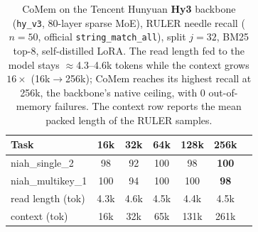 \begin{table}[t]
\centering
\small
\begin{tabular}{@{}lcccccc@{}}
\toprule
\textbf{Task} & 16k & 32k & 64k & 128k & 256k \\
\midrule
niah\_single\_2   &  98 & 92 & 100 &  98 & \textbf{100} \\
niah\_multikey\_1 & 100 & 94 & 100 & 100 & \textbf{98} \\
\midrule
read length (tok) & 4.3k & 4.6k & 4.5k & 4.4k & 4.5k \\
context (tok)     & 16k  & 32k  & 65k  & 131k & 261k \\
\bottomrule
\end{tabular}
\caption{CoMem on the Tencent Hunyuan \textbf{Hy3} backbone (\texttt{hy\_v3},
80-layer sparse MoE), RULER needle recall ($n{=}50$, official
\texttt{string\_match\_all}), split $j{=}32$, BM25 top-$8$, self-distilled LoRA.
The read length fed to the model stays $\approx$4.3--4.6k tokens while the
context grows $16\times$ (16k$\to$256k); CoMem reaches its highest recall at 256k,
the backbone's native ceiling, with $0$ out-of-memory failures. The
context row reports the mean packed length of the RULER samples.}
\label{tab:hy3ruler}
\end{table}
